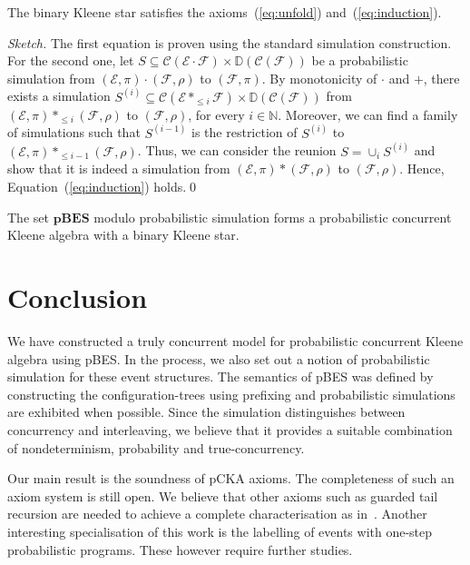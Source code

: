 \documentclass{llncs}
\newcommand{\pBES}{\mathbf{pBES}}
\newcommand{\C}{\mathcal{C}}
\newcommand{\D}{\mathbb{D}}
\newcommand{\N}{\mathbb{N}}
\newcommand{\EE}{\mathcal{E}}
\newcommand{\FF}{\mathcal{F}}
\newcommand{\<}{\langle}
\renewcommand{\>}{\rangle}
\begin{document}
\begin{proposition}\label{pro:kleene-star}
The binary Kleene star satisfies the axioms~(\ref{eq:unfold}) and~(\ref{eq:induction}).
\end{proposition}
\begin{proof}[Sketch]
The first equation is proven using the standard simulation construction. For the second one, let $S\subseteq\C(\EE\cdot\FF)\times\D(\C(\FF))$ be a probabilistic simulation from $(\EE,\pi)\cdot(\FF,\rho)$ to $(\FF,\pi)$. By monotonicity of $\cdot$ and $+$, there exists a simulation $S^{(i)}\subseteq\C(\EE*_{\le i}\FF)\times\D(\C(\FF))$ from $(\EE,\pi)*_{\le i}(\FF,\rho)$ to $(\FF,\rho)$, for every $i\in\N$. Moreover, we can find a family of simulations such that $S^{(i-1)}$ is the restriction of $S^{(i)}$ to $(\EE,\pi)*_{\le i-1}(\FF,\rho)$. Thus, we can consider the reunion $S = \cup_i S^{(i)}$ and show that it is indeed a simulation from $(\EE,\pi)*(\FF,\rho)$ to $(\FF,\rho)$. Hence, Equation~(\ref{eq:induction}) holds.\qed
\end{proof}

\begin{theorem}
The set $\pBES$ modulo probabilistic simulation forms a probabilistic concurrent Kleene algebra with a binary Kleene star.
\end{theorem}

\section{Conclusion}

We have constructed a truly concurrent model for probabilistic concurrent Kleene algebra using pBES. In the process, we also set out a notion of probabilistic simulation for these event structures. The semantics of pBES was defined by constructing the configuration-trees using prefixing and probabilistic simulations are exhibited when possible. Since the simulation distinguishes between concurrency and interleaving, we believe that it provides a suitable combination of nondeterminism, probability and true-concurrency.

Our main result is the soundness of pCKA axioms. The completeness of such an axiom system is still open. We believe that other axioms such as guarded tail recursion are needed to achieve a complete characterisation as in~\cite{Seg04}. Another interesting specialisation of this work is the labelling of events with one-step probabilistic programs. These however require further studies.
\end{document}
